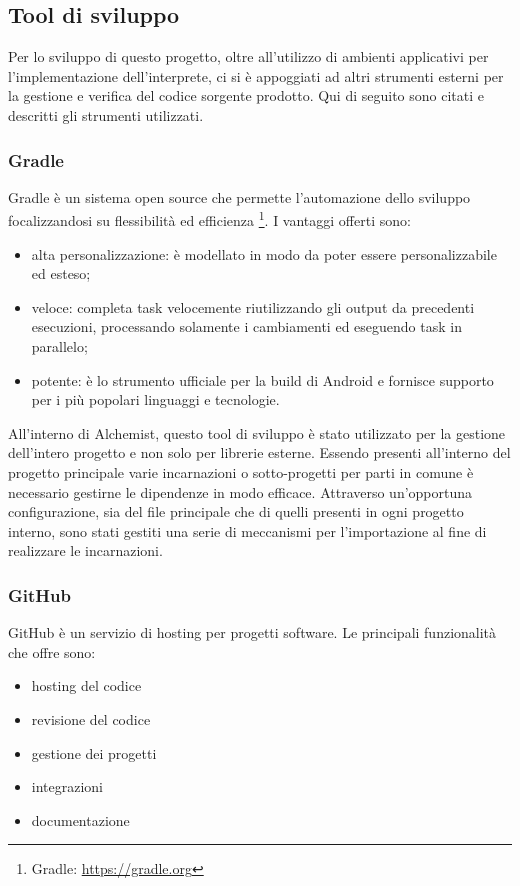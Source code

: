 \subsection{Tool di sviluppo}
Per lo sviluppo di questo progetto, oltre all'utilizzo di ambienti applicativi per l'implementazione dell'interprete, ci si è appoggiati ad altri strumenti esterni per la gestione e verifica del codice sorgente prodotto. Qui di seguito sono citati e descritti gli strumenti utilizzati.

\subsubsection{Gradle}
Gradle è un sistema open source che permette l'automazione dello sviluppo focalizzandosi su flessibilità ed efficienza \footnote{Gradle: \url{https://gradle.org}}. I vantaggi offerti sono:
\begin{itemize}
\item alta personalizzazione: è modellato in modo da poter essere personalizzabile ed esteso;
\item veloce: completa task velocemente riutilizzando gli output da precedenti esecuzioni, processando solamente i cambiamenti ed eseguendo task in parallelo;
\item potente: è lo strumento ufficiale per la build di Android e fornisce supporto per i più popolari linguaggi e tecnologie.
\end{itemize}
All'interno di Alchemist, questo tool di sviluppo è stato utilizzato per la gestione dell'intero progetto e non solo per librerie esterne. Essendo presenti all'interno del progetto principale varie incarnazioni o sotto-progetti per parti in comune è necessario gestirne le dipendenze in modo efficace. Attraverso un'opportuna configurazione, sia del file principale che di quelli presenti in ogni progetto interno, sono stati gestiti una serie di meccanismi per l'importazione al fine di realizzare le incarnazioni.

\subsubsection{GitHub}
GitHub è un servizio di hosting per progetti software. Le principali funzionalità che offre sono:
\begin{itemize}
\item hosting del codice
\item revisione del codice
\item gestione dei progetti
\item integrazioni
\item documentazione
\end{itemize}

